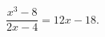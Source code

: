\begin{ex}[type=equation]
	\begin{condition}
		$\dfrac{x^3 - 8}{2x - 4} = 12 x -18.$
	\end{condition}
\end{ex}